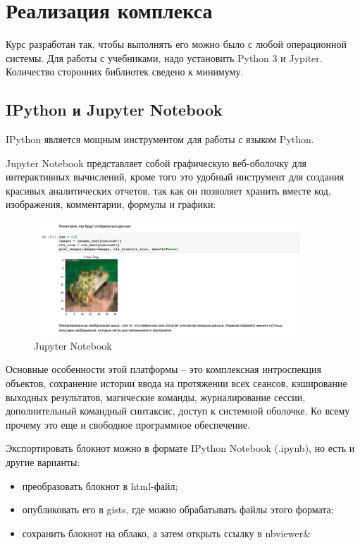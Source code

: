 \chapter{Реализация комплекса}

Курс разработан так, чтобы выполнять его можно было с любой операционной системы. Для работы с учебниками, надо установить Python 3 и Jypiter. Количество сторонних библиотек сведено к минимуму.

\section{IPython и Jupyter Notebook}

IPython является мощным инструментом для работы с языком Python. 

Jupyter Notebook представляет собой графическую веб-оболочку для интерактивных вычислений, кроме того это удобный инструмент для создания красивых аналитических отчетов, так как он позволяет хранить вместе код, изображения, комментарии, формулы и графики:

\begin{figure}[htbp]
	\centering
	\includegraphics[width=0.9\textwidth]{fig/jn}
	\caption{Jupyter Notebook }
\end{figure}

Основные особенности этой платформы – это комплексная интроспекция объектов, сохранение истории ввода на протяжении всех сеансов, кэширование выходных результатов, магические команды, журналирование сессии, дополнительный командный синтаксис, доступ к системной оболочке. Ко всему прочему это еще и свободное программное обеспечение.

Экспортировать блокнот можно в формате IPython Notebook (.ipynb), но есть и другие варианты:
\begin{itemize}
\item преобразовать блокнот в html-файл;
\item опубликовать его в gists, где можно обрабатывать файлы этого формата;
\item сохранить блокнот на облако, а затем открыть ссылку в nbviewer&
\end{itemize}



